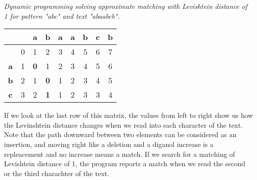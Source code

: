 \begin{example} \emph{Dynamic programming solving approximate matching with Levishtein distance of 1 for pattern "abc" and text "abaabcb".}

\begin{table}[H]
	\centering
	\begin{tabular}{|c|c|c|c|c|c|c|c|c|}
\hline
\textbf{}                         & \textbf{}                & \textbf{a}               & \textbf{b}               & \textbf{a}               & \textbf{a}               & \textbf{b}               & \textbf{c}               & \textbf{b}               \\ \hline
& 0                        & 1                        & 2                        & 3                        & 4                        & 5                        & 6                        & 7                        \\ \hline
\textbf{a}                        & 1                        & \textbf{0} & 1                        & {\color[HTML]{333333} 2} & {\color[HTML]{333333} 3} & {\color[HTML]{333333} 4} & {\color[HTML]{333333} 5} & {\color[HTML]{333333} 6} \\ \hline
\textbf{b}                        & 2                        & 1                        &\textbf{0}                       & {\color[HTML]{333333} 1} & {\color[HTML]{333333} 2} & {\color[HTML]{333333} 3} & {\color[HTML]{333333} 4} & {\color[HTML]{333333} 5} \\ \hline
{\color[HTML]{333333} \textbf{c}} & {\color[HTML]{333333} 3} & {\color[HTML]{333333} 2} & \textbf{\color[HTML]{32CB00} 1} & {\color[HTML]{32CB00} 1} & {\color[HTML]{333333} 2} & {\color[HTML]{000000} 3} & {\color[HTML]{333333} 3} & {\color[HTML]{333333} 4} \\ \hline
\end{tabular}
\end{table}
	\label{fig:dynap}
 \end{example}
 
If we look at the last row of this matrix, the values from left to right show us how the Levinshtein distance changes when we read into each character of the text. Note that the path downward between two elements can be considered as an insertion, and moving right like a deletion and a diganol increase is a repleacement and no increase means a match. If we search for a matching of Levishtein distance of 1, the program reports a match when we read the second or the third charachter of the text.

